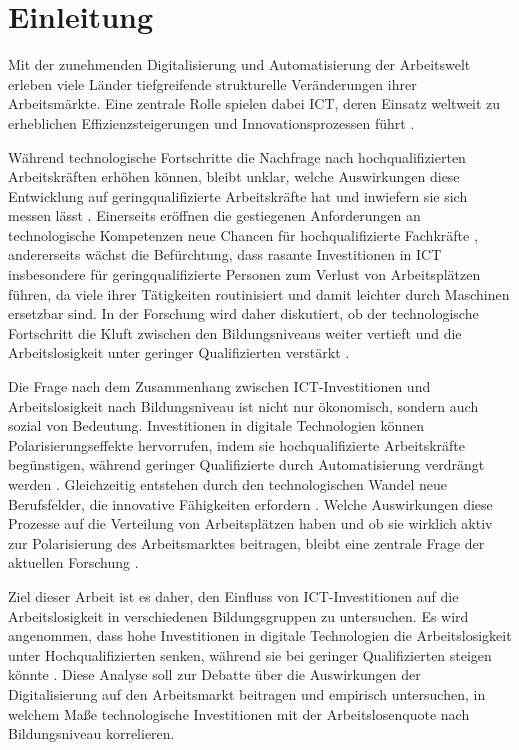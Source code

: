 
\section{Einleitung}

Mit der zunehmenden Digitalisierung und Automatisierung der Arbeitswelt erleben viele 
Länder tiefgreifende strukturelle Veränderungen ihrer Arbeitsmärkte. Eine zentrale Rolle 
spielen dabei \ac{ICT}, deren Einsatz weltweit zu erheblichen Effizienzsteigerungen und 
Innovationsprozessen führt \parencite[vgl.][Kap. 6]{brynjolfsson2014thesecond}.

Während technologische Fortschritte die Nachfrage nach hochqualifizierten Arbeitskräften 
erhöhen können, bleibt unklar, welche Auswirkungen diese Entwicklung auf 
geringqualifizierte Arbeitskräfte hat und inwiefern sie sich messen lässt 
\parencite[vgl.][S. 1045]{acemoglu2011skills}. Einerseits eröffnen die gestiegenen 
Anforderungen an technologische Kompetenzen neue Chancen für hochqualifizierte 
Fachkräfte \parencite[vgl.][S. 1070]{acemoglu2011skills}, andererseits wächst die 
Befürchtung, dass rasante Investitionen in \ac{ICT} insbesondere für geringqualifizierte 
Personen zum Verlust von Arbeitsplätzen führen, da viele ihrer Tätigkeiten routinisiert 
und damit leichter durch Maschinen ersetzbar sind. In der Forschung wird daher diskutiert, 
ob der technologische Fortschritt die Kluft zwischen den Bildungsniveaus weiter vertieft 
und die Arbeitslosigkeit unter geringer Qualifizierten verstärkt 
\parencite[vgl.][S. 2–4]{balsmeier2019isthis}.

Die Frage nach dem Zusammenhang zwischen \ac{ICT}-Investitionen und Arbeitslosigkeit 
nach Bildungsniveau ist nicht nur ökonomisch, sondern auch sozial von Bedeutung. 
Investitionen in digitale Technologien können Polarisierungseffekte hervorrufen, 
indem sie hochqualifizierte Arbeitskräfte begünstigen, während geringer Qualifizierte 
durch Automatisierung verdrängt werden \parencite[vgl.][S. 14–15]{frey2013thefuture}. 
Gleichzeitig entstehen durch den technologischen Wandel neue Berufsfelder, die 
innovative Fähigkeiten erfordern \parencite[vgl.][Kap. 12]{brynjolfsson2014thesecond}. 
Welche Auswirkungen diese Prozesse auf die Verteilung von Arbeitsplätzen haben und 
ob sie wirklich aktiv zur Polarisierung des Arbeitsmarktes beitragen, bleibt eine 
zentrale Frage der aktuellen Forschung \parencite[vgl.][S. 2–4]{balsmeier2019isthis}.

Ziel dieser Arbeit ist es daher, den Einfluss von \ac{ICT}-Investitionen auf die 
Arbeitslosigkeit in verschiedenen Bildungsgruppen zu untersuchen. Es wird angenommen, 
dass hohe Investitionen in digitale Technologien die Arbeitslosigkeit unter 
Hochqualifizierten senken, während sie bei geringer Qualifizierten steigen könnte 
\parencite[vgl.][S. 1045]{acemoglu2011skills}. Diese Analyse soll zur Debatte über die 
Auswirkungen der Digitalisierung auf den Arbeitsmarkt beitragen und empirisch untersuchen, 
in welchem Maße technologische Investitionen mit der Arbeitslosenquote nach 
Bildungsniveau korrelieren.

